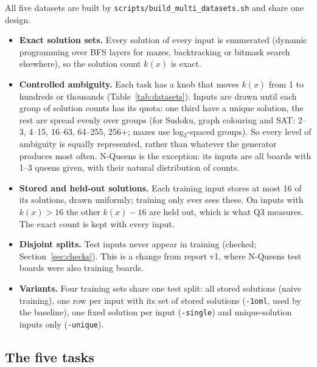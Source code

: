 \documentclass[11pt]{article}
\begin{document}
All five datasets are built by \texttt{scripts/build\_multi\_datasets.sh} and share one design.
\begin{itemize}
  \item \textbf{Exact solution sets.} Every solution of every input is enumerated (dynamic programming over BFS
  layers for mazes, backtracking or bitmask search elsewhere), so the solution count $k(x)$ is exact.
  \item \textbf{Controlled ambiguity.} Each task has a knob that moves $k(x)$ from 1 to hundreds or thousands
  (Table~\ref{tab:datasets}). Inputs are drawn until each group of solution counts has its quota: one third have a
  unique solution, the rest are spread evenly over groups (for Sudoku, graph colouring and SAT: 2--3, 4--15, 16--63,
  64--255, 256+; mazes use log$_2$-spaced groups). So every level of ambiguity is equally represented, rather than
  whatever the generator produces most often. N-Queens is the exception: its inputs are all boards with 1--3 queens
  given, with their natural distribution of counts.
  \item \textbf{Stored and held-out solutions.} Each training input stores at most 16 of its solutions, drawn
  uniformly; training only ever sees these. On inputs with $k(x)>16$ the other $k(x)-16$ are held out, which is what
  Q3 measures. The exact count is kept with every input.
  \item \textbf{Disjoint splits.} Test inputs never appear in training (checked; Section~\ref{sec:checks}). This is a
  change from report v1, where N-Queens test boards were also training boards.
  \item \textbf{Variants.} Four training sets share one test split: all stored solutions (naive training), one row per
  input with its set of stored solutions (\texttt{-1oml}, used by the baseline), one fixed solution per input
  (\texttt{-single}) and unique-solution inputs only (\texttt{-unique}).
\end{itemize}

\subsection{The five tasks}
\end{document}

